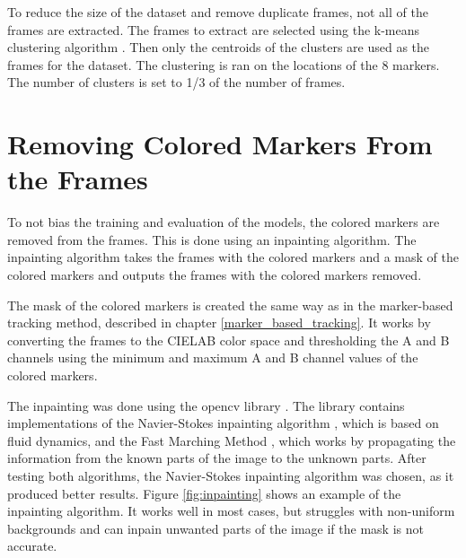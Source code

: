 To reduce the size of the dataset and remove duplicate frames, not all of the frames are extracted. The frames to extract are selected using the k-means clustering algorithm \cite{kmeans}. Then only the centroids of the clusters are used as the frames for the dataset. The clustering is ran on the locations of the 8 markers. The number of clusters is set to 1/3 of the number of frames.

\section{Removing Colored Markers From the Frames}
To not bias the training and evaluation of the models, the colored markers are removed from the frames. This is done using an inpainting algorithm. The inpainting algorithm takes the frames with the colored markers and a mask of the colored markers and outputs the frames with the colored markers removed.

The mask of the colored markers is created the same way as in the marker-based tracking method, described in chapter \ref{marker_based_tracking}. It works by converting the frames to the CIELAB color space and thresholding the A and B channels using the minimum and maximum A and B channel values of the colored markers.

The inpainting was done using the opencv library \cite{opencv}. The library contains implementations of the Navier-Stokes inpainting algorithm \cite{ns-inpainting}, which is based on fluid dynamics, and the Fast Marching Method \cite{fast-marching-inpainting}, which works by propagating the information from the known parts of the image to the unknown parts. After testing both algorithms, the Navier-Stokes inpainting algorithm was chosen, as it produced better results. Figure \ref{fig:inpainting} shows an example of the inpainting algorithm. It works well in most cases, but struggles with non-uniform backgrounds and can inpain unwanted parts of the image if the mask is not accurate.

